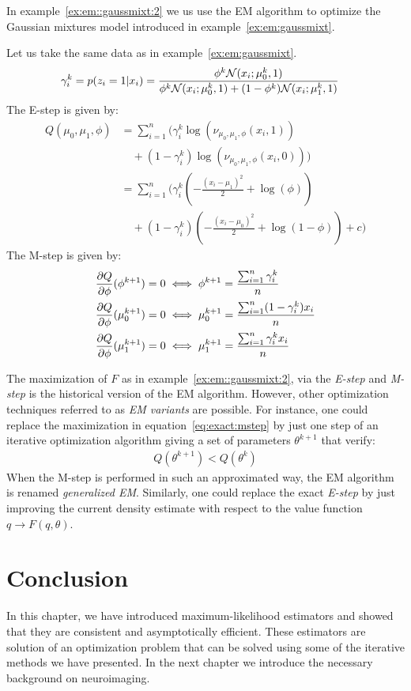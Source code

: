In example~\ref{ex:em::gaussmixt:2} we us use the EM algorithm to optimize the Gaussian mixtures model introduced in example~\eqref{ex:em:gaussmixt}.
\begin{example}
  \label{ex:em::gaussmixt:2}
  Let us take the same data as in example~\ref{ex:em:gaussmixt}.
  \begin{align}
    \gamma_i^k = p(z_i = 1 | x_i) &= \frac{\phi^k \mathcal{N}(x_i; \mu_0^k, 1)}{ \phi^k \mathcal{N}(x_i; \mu_0^k, 1) + (1 - \phi^k) \mathcal{N}(x_i; \mu_1^k, 1)} 
  \end{align}
  The E-step is given by:
  \begin{align}
    Q(\mu_0, \mu_1, \phi) &= \sum_{i=1}^n \Big( \gamma_i^k \log(\nu_{\mu_0, \mu_1, \phi}(x_i, 1)) \\ &\enspace \enspace + (1 - \gamma_i^k) \log(\nu_{\mu_0, \mu_1, \phi}(x_i, 0)) \Big) \\
              &= \sum_{i=1}^n \Big( \gamma_i^k( -\frac{(x_i - \mu_1)^2}{2} + \log(\phi)) \\ &\enspace \enspace + (1 - \gamma_i^k) ( -\frac{(x_i - \mu_0)^2}{2} + \log(1 -\phi)) + c \Big)
 \end{align}
 The M-step is given by:
 \begin{align}
   &\frac{ \partial Q}{\partial \phi}(\phi^{k + 1}) = 0 \iff \phi^{k + 1} = \frac{\sum_{i=1}^n \gamma_i^k}{n} \\
   &\frac{ \partial Q}{\partial \phi}(\mu^{k+1}_0) = 0 \iff \mu^{k + 1}_0 = \frac{\sum_{i=1}^n (1 - \gamma_i^k) x_i}{n} \\
   &\frac{ \partial Q}{\partial \phi}(\mu^{k+1}_1) = 0 \iff \mu^{k + 1}_1 = \frac{\sum_{i=1}^n \gamma_i^k x_i}{n} \\
 \end{align}
\end{example}


The maximization of $F$ as in example~\ref{ex:em::gaussmixt:2}, via the \emph{E-step} and \emph{M-step} is the
historical version of the EM algorithm. However, other optimization techniques
referred to as \emph{EM variants}
are possible. For instance, one could replace the maximization in
equation~\eqref{eq:exact:mstep} by just one step of an iterative optimization
algorithm giving a set of parameters $\theta^{k+1}$ that verify:
\begin{align}
  Q(\theta^{k+1}) < Q(\theta^k) 
\end{align}
When the M-step is performed in such an approximated way, the EM algorithm
is renamed \emph{generalized EM}.
Similarly, one could replace the exact \emph{E-step} by just improving the
current density estimate with respect to the value function $q \rightarrow F(q,
\theta)$.

\section{Conclusion}
In this chapter, we have introduced maximum-likelihood estimators and showed
that they are consistent and asymptotically efficient. These estimators are
solution of an optimization problem that can be solved using some of the
iterative methods we have presented.
In the next chapter we introduce the necessary background on neuroimaging.
